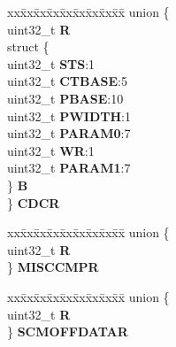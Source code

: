 \begin{DoxyCompactItemize}
\begin{tabbing}
\end{tabbing}\item 
\mbox{\label{structETPU__tag_a10d6e7da7f2cec873b7c760894a232b6}} 
\begin{tabbing}
xx\=xx\=xx\=xx\=xx\=xx\=xx\=xx\=xx\=\kill
union \{\\
\>uint32\_t {\bfseries R}\\
\>struct \{\\
\>\>uint32\_t {\bfseries STS}:1\\
\>\>uint32\_t {\bfseries CTBASE}:5\\
\>\>uint32\_t {\bfseries PBASE}:10\\
\>\>uint32\_t {\bfseries PWIDTH}:1\\
\>\>uint32\_t {\bfseries PARAM0}:7\\
\>\>uint32\_t {\bfseries WR}:1\\
\>\>uint32\_t {\bfseries PARAM1}:7\\
\>\} {\bfseries B}\\
\} {\bfseries CDCR}\\

\end{tabbing}\item 
\mbox{\label{structETPU__tag_ae5e074a4e515d11b16ff6c60f30c19b2}} 
\begin{tabbing}
xx\=xx\=xx\=xx\=xx\=xx\=xx\=xx\=xx\=\kill
union \{\\
\>uint32\_t {\bfseries R}\\
\} {\bfseries MISCCMPR}\\

\end{tabbing}\item 
\mbox{\label{structETPU__tag_abe65bdca644d70b454651967cce7dfd7}} 
\begin{tabbing}
xx\=xx\=xx\=xx\=xx\=xx\=xx\=xx\=xx\=\kill
union \{\\
\>uint32\_t {\bfseries R}\\
\} {\bfseries SCMOFFDATAR}\\


\end{tabbing}
\end{DoxyCompactItemize}
